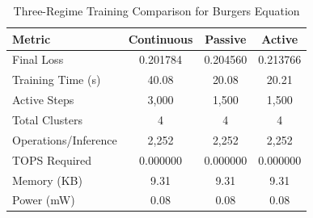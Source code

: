 \begin{table}[htbp]
\centering
\caption{Three-Regime Training Comparison for Burgers Equation}
\label{tab:three_regime_comparison}
\begin{tabular}{l|ccc}
\hline
\textbf{Metric} & \textbf{Continuous} & \textbf{Passive} & \textbf{Active} \\
\hline
Final Loss & 0.201784 & 0.204560 & 0.213766 \\
Training Time (s) & 40.08 & 20.08 & 20.21 \\
Active Steps & 3,000 & 1,500 & 1,500 \\
Total Clusters & 4 & 4 & 4 \\
Operations/Inference & 2,252 & 2,252 & 2,252 \\
TOPS Required & 0.000000 & 0.000000 & 0.000000 \\
Memory (KB) & 9.31 & 9.31 & 9.31 \\
Power (mW) & 0.08 & 0.08 & 0.08 \\
\hline
\end{tabular}
\end{table}
